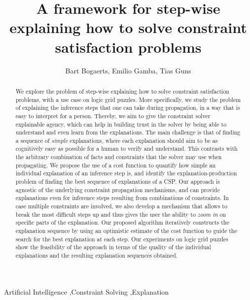 \documentclass[3p]{elsarticle}
\begin{document}
\begin{frontmatter}

\title{A framework for step-wise explaining how to solve constraint satisfaction problems}

\author[mymainaddress]{Bart Bogaerts, Emilio Gamba, Tias Guns}
\address{Vrije Universiteit Brussel, Pleinlaan 2, 1050 Brussel, Belgium}
\date{}

\begin{abstract}
We explore the problem of step-wise explaining how to solve constraint satisfaction problems, with a use case on logic grid puzzles.
More specifically, we study the problem of explaining the inference steps that one can take during propagation, in a way that is easy to interpret for a person.
Thereby, we aim to give the constraint solver explainable agency, which can help in building trust in the solver by being able to understand and even learn from the explanations.
The main challenge is that of finding a sequence of \textit{simple} explanations, where each explanation should aim to be as cognitively easy as possible for a human to verify and understand. 
This contrasts with the arbitrary combination of facts and constraints that the solver may use when propagating.
We propose the use of a cost function to quantify how simple an individual explanation of an inference step is, and identify the explanation-production problem of finding the best sequence of explanations of a CSP. 
Our approach is agnostic of the underlying constraint propagation mechanisms, and can provide explanations even for inference steps resulting from combinations of constraints. 
In case multiple constraints are involved, we also develop a mechanism that allows to break the most difficult steps up and thus gives the user the ability to \emph{zoom in} on specific parts of the explanation. 
Our proposed algorithm iteratively constructs the explanation sequence by using an optimistic estimate of the cost function to guide the search for the best explanation at each step.
Our experiments on logic grid puzzles show the feasibility of the approach in terms of the quality of the individual explanations and the resulting explanation sequences obtained.
\end{abstract}

\begin{keyword}
Artificial Intelligence \sep Constraint Solving \sep Explanation
\end{keyword}

\end{frontmatter}
\end{document}
